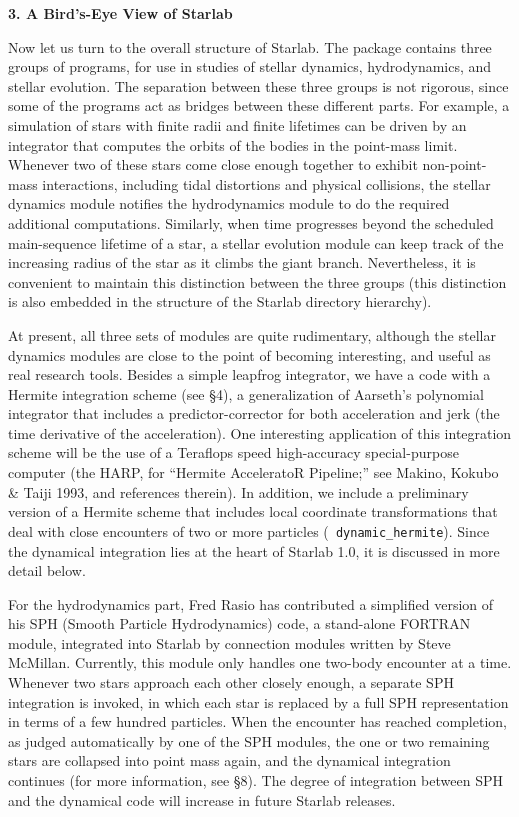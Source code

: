 \null\bigskip
\centerline{\bf 3. A Bird's-Eye View of Starlab}
\medskip

Now let us turn to the overall structure of Starlab.  The package
contains three groups of programs, for use in studies of stellar
dynamics, hydrodynamics, and stellar evolution.  The separation
between these three groups is not rigorous, since some of the programs
act as bridges between these different parts.  For example, a
simulation of stars with finite radii and finite lifetimes can be
driven by an integrator that computes the orbits of the bodies in the
point-mass limit.  Whenever two of these stars come close enough
together to exhibit non-point-mass interactions, including tidal
distortions and physical collisions, the stellar dynamics module
notifies the hydrodynamics module to do the required additional
computations.  Similarly, when time progresses beyond the scheduled
main-sequence lifetime of a star, a stellar evolution module can keep
track of the increasing radius of the star as it climbs the giant
branch.  Nevertheless, it is convenient to maintain this distinction
between the three groups (this distinction is also embedded in the
structure of the Starlab directory hierarchy).

At present, all three sets of modules are quite rudimentary, although
the stellar dynamics modules are close to the point of becoming
interesting, and useful as real research tools.  Besides a simple
leapfrog integrator, we have a code with a Hermite integration scheme
(see \S4), a generalization of Aarseth's polynomial integrator that
includes a predictor-corrector for both acceleration and jerk (the
time derivative of the acceleration).  One interesting application of
this integration scheme will be the use of a Teraflops speed
high-accuracy special-purpose computer (the HARP, for ``Hermite
AcceleratoR Pipeline;'' see Makino, Kokubo \& Taiji 1993, and
references therein).  In addition, we include a preliminary version of
a Hermite scheme that includes local coordinate transformations that
deal with close encounters of two or more particles ({\tt
dynamic\_hermite}).  Since the dynamical integration lies at the heart
of Starlab 1.0, it is discussed in more detail below.

For the hydrodynamics part, Fred Rasio has contributed a simplified
version of his SPH (Smooth Particle Hydrodynamics) code, a stand-alone
FORTRAN module, integrated into Starlab by connection modules written
by Steve McMillan.  Currently, this module only handles one two-body
encounter at a time.  Whenever two stars approach each other closely
enough, a separate SPH integration is invoked, in which each star is
replaced by a full SPH representation in terms of a few hundred
particles.  When the encounter has reached completion, as judged
automatically by one of the SPH modules, the one or two remaining
stars are collapsed into point mass again, and the dynamical
integration continues (for more information, see \S 8).  The degree of
integration between SPH and the dynamical code will increase in future
Starlab releases.

